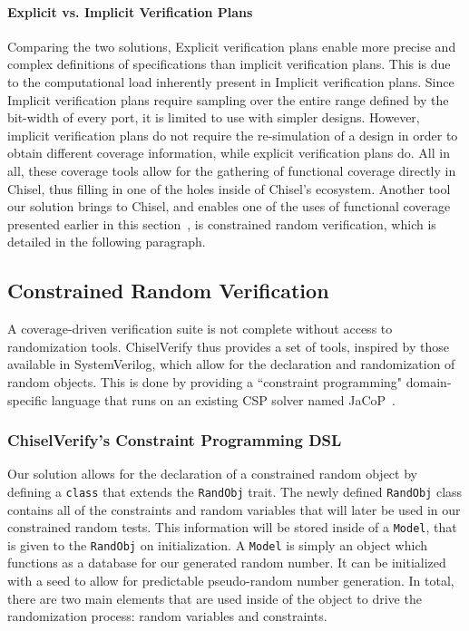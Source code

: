 \documentclass[conference]{IEEEtran}
\begin{document}
\paragraph{Explicit vs. Implicit Verification Plans}
Comparing the two solutions, Explicit verification plans enable more precise and complex definitions of specifications than implicit verification plans.
This is due to the computational load inherently present in Implicit verification plans. 
Since Implicit verification plans require sampling over the entire range defined by the bit-width of every port, it is limited to use with simpler designs.
However, implicit verification plans do not require the re-simulation of a design in order to obtain different coverage information, while explicit verification plans do.
All in all, these coverage tools allow for the gathering of functional coverage directly in Chisel, thus filling in one of the holes inside of Chisel's ecosystem.
Another tool our solution brings to Chisel, and enables one of the uses of functional coverage presented earlier in this section~\cite{verify:fuzzing:2021}, is constrained random verification, which is detailed in the following paragraph.

\subsection{Constrained Random Verification}
A coverage-driven verification suite is not complete without access to randomization tools.
ChiselVerify thus provides a set of tools, inspired by those available in SystemVerilog, which allow for the declaration and randomization of random objects.
This is done by providing a ``constraint programming" domain-specific language that runs on an existing CSP solver named JaCoP~\cite{jacop2013}.

\subsubsection{ChiselVerify's Constraint Programming DSL}
Our solution allows for the declaration of a constrained random object by defining a \texttt{class} that extends the \texttt{RandObj} trait.
The newly defined \texttt{RandObj} class contains all of the constraints and random variables that will later be used in our constrained random tests. 
This information will be stored inside of a \texttt{Model}, that is given to the \texttt{RandObj} on initialization.
A \texttt{Model} is simply an object which functions as a database for our generated random number. It can be initialized with a seed to allow for predictable pseudo-random number generation.
In total, there are two main elements that are used inside of the object to drive the randomization process: random variables and constraints.
\end{document}
